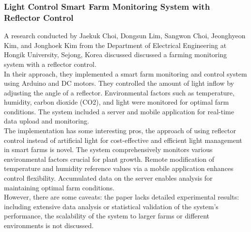 \documentclass[12pt, a4paper]{article}
\begin{document}
\subsubsection{Light Control Smart Farm Monitoring System with Reflector Control}
A research conducted by Jaekuk Choi, Dongsun Lim, Sangwon Choi, Jeonghyeon Kim, and Jonghoek Kim from the Department of Electrical Engineering at Hongik University, Sejong, Korea discussed discussed a farming monitoring system with a reflector control.\\
In their approach, they implemented a smart farm monitoring and control system using Arduino and DC motors. They controlled the amount of light inflow by adjusting the angle of a reflector. Environmental factors such as temperature, humidity, carbon dioxide (CO2), and light were monitored for optimal farm conditions. The system included a server and mobile application for real-time data upload and monitoring.\\
The implementation has some interesting pros, the approach of using reflector control instead of artificial light for cost-effective and efficient light management in smart farms is novel.  The system comprehensively monitors various environmental factors crucial for plant growth. Remote modification of temperature and humidity reference values via a mobile application enhances control flexibility.
Accumulated data on the server enables analysis for maintaining optimal farm conditions.
\\
However, there are some caveats: the paper lacks detailed experimental results: including extensive data analysis or statistical validation of the system's performance, the scalability of the system to larger farms or different environments is not discussed.
\end{document}
